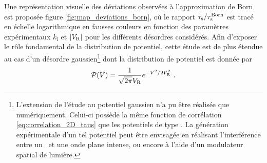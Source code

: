 Une représentation visuelle des déviations observées à l'approximation de Born est proposée figure \ref{fig:map_deviations_born}, où le rapport $\tau_{\mathrm{s}}/\tau_{\mathrm{s}}^{\mathrm{Born}}$ est tracé en échelle logarithmique en fausses couleurs en fonction des paramètres expérimentaux $k_{\mathrm{i}}$ et $|V_{\mathrm{R}}|$ pour les différents désordres considérés.  Afin d'exposer le rôle fondamental de la distribution de potentiel, cette étude est de plus étendue au cas d'un désordre gaussien\footnote{L'extension de l'étude au potentiel gaussien n'a pu être réalisée que numériquement. Celui-ci possède la même fonction de corrélation \ref{eq:correlation_2D_taus} que les potentiels de type \speckle . La génération expérimentale d'un tel potentiel peut être envisagée en réalisant l'interférence entre un \speckle\ et une onde plane intense, ou encore à l'aide d'un modulateur spatial de lumière.} dont la distribution de potentiel est donnée par
\begin{equation}
\mathcal{P}(V)=\frac{1}{\sqrt{2\pi} V_{\mathrm{R}}} e^{-V^2/2V_{\mathrm{R}}^2} \text{ .}
\end{equation}

